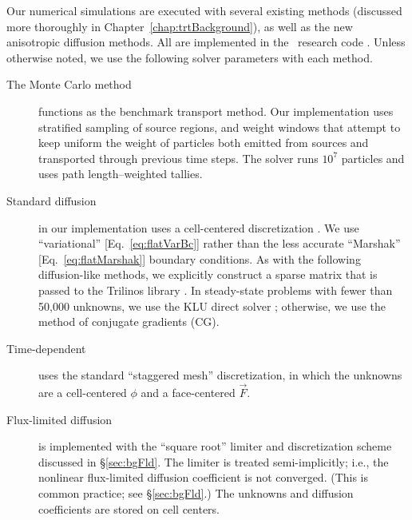 Our numerical simulations are executed with several existing methods
(discussed more thoroughly in Chapter~\ref{chap:trtBackground}), as well
as the new anisotropic diffusion methods. All
are implemented in the \pytrt\ research code \cite{Pytrt}. Unless otherwise
noted, we use the following solver parameters with each method.
\begin{description}
  \item[The Monte Carlo method] functions as the benchmark transport method. Our
    implementation uses stratified sampling of source regions, and weight
    windows that attempt to keep uniform the weight of particles both emitted
    from sources and transported through previous time steps. The solver runs
    $10^7$ particles and uses path length--weighted tallies.

  \item[Standard diffusion] in our implementation uses a cell-centered
    discretization \cite{Dud1976}.  We use ``variational''
    [Eq.~\eqref{eq:flatVarBc}] rather than the less
    accurate ``Marshak'' [Eq.~\eqref{eq:flatMarshak}] boundary conditions.
    As with the following diffusion-like methods, we explicitly
    construct a sparse matrix that is passed to the Trilinos library
    \cite{Her2003}.  In steady-state problems with fewer than 50,000 unknowns,
    we use the KLU direct solver \cite{Her2003}; otherwise, we use the method
    of conjugate gradients (CG).

  \item[Time-dependent \Pone] uses the standard ``staggered mesh''
    discretization, in which the unknowns are a cell-centered $\phi$ and
    a face-centered $\vec{F}$.

  \item[Flux-limited diffusion] is implemented with the ``square root'' limiter
    and discretization scheme discussed in \S\ref{sec:bgFld}. The limiter is
    treated semi-implicitly; i.e., the nonlinear flux-limited diffusion
    coefficient is not converged. (This is common practice; see
    \S\ref{sec:bgFld}.) The unknowns and diffusion coefficients are
    stored on cell centers.


\end{description}
